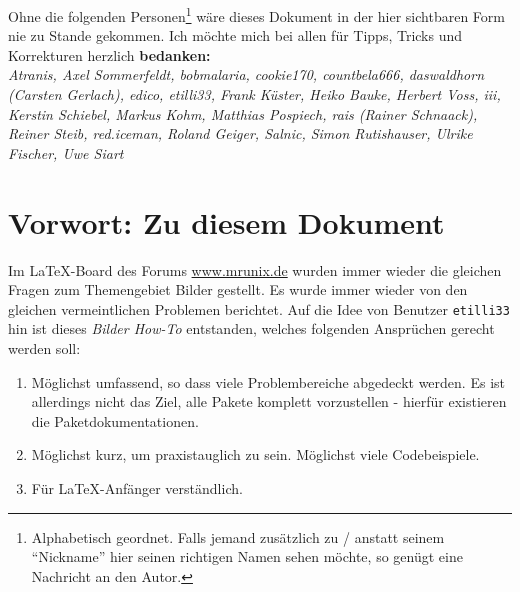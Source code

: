 \documentclass[%
a4paper, %
12pt, %
DIV0, %
final, %
halfparskip %
]{scrartcl} %
\begin{document}
\begin{titlepage}
\begin{center}
Ohne die folgenden Personen\footnote{Alphabetisch geordnet. Falls jemand zusätzlich zu / anstatt seinem "`Nickname"' hier seinen richtigen Namen sehen möchte, so genügt eine Nachricht an den Autor.} wäre dieses Dokument in der hier sichtbaren Form nie zu Stande gekommen. Ich möchte mich bei allen für Tipps, Tricks und Korrekturen herzlich \textbf{bedanken:}\\[1em]
\textit{Atranis, Axel Sommerfeldt, bobmalaria, cookie170, countbela666, daswaldhorn (Carsten Gerlach), edico, etilli33, Frank Küster, Heiko Bauke, Herbert Voss, iii, Kerstin Schiebel, Markus Kohm, Matthias Pospiech, rais (Rainer Schnaack), Reiner Steib, red.iceman, Roland Geiger, Salnic, Simon Rutishauser, Ulrike Fischer, Uwe Siart}\\[1em]



\clearpage

\end{center}

\end{titlepage}



\tableofcontents
\newpage



\section{Vorwort: Zu diesem Dokument}
Im \LaTeX-Board des Forums \url{www.mrunix.de} wurden immer wieder die gleichen Fragen zum Themengebiet Bilder gestellt. Es wurde immer wieder von den gleichen vermeintlichen Problemen berichtet. Auf die Idee von Benutzer \texttt{etilli33} hin ist dieses \textit{Bilder How-To} entstanden, welches folgenden Ansprüchen gerecht werden soll:
\begin{enumerate}
	\item Möglichst umfassend, so dass viele Problembereiche abgedeckt werden. Es ist allerdings nicht das Ziel, alle Pakete komplett vorzustellen - hierfür existieren die Paketdokumentationen.
	\item Möglichst kurz, um praxistauglich zu sein. Möglichst viele Codebeispiele.
	\item Für \LaTeX-Anfänger verständlich. 
\end{enumerate}
\end{document}
